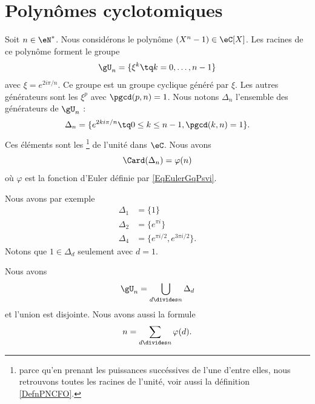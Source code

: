 \section{Polynômes cyclotomiques}

Soit \( n\in \eN^*\). Nous considérons le polynôme \( (X^n-1)\in\eC[X]\). Les racines de ce polynôme forment le groupe
\begin{equation}
    \gU_n=\{ \xi^k\tq k=0,\ldots, n-1 \}
\end{equation}
avec \( \xi= e^{2i\pi/n}\). Ce groupe est un groupe cyclique généré par \( \xi\). Les autres générateurs sont les \( \xi^p\) avec \( \pgcd(p,n)=1\). Nous notons \( \Delta_n\) l'ensemble des générateurs de \( \gU_n\) :
\begin{equation}
    \Delta_n=\{  e^{2ki\pi/n}\tq 0\leq k\leq n-1,\pgcd(k,n)=1 \}.
\end{equation}
Ces éléments sont les \footnote{parce qu'en prenant les puissances succéssives de l'une d'entre elles, nous retrouvons toutes les racines de l'unité, voir aussi la définition \ref{DefnPNCFO}.} de l'unité dans \( \eC\). Nous avons 
\begin{equation}
    \Card(\Delta_n)=\varphi(n)
\end{equation}
où \( \varphi\) est la fonction d'Euler définie par \eqref{EqEulerGqPsvi}.

Nous avons par exemple
\begin{subequations}
    \begin{align}
        \Delta_1&=\{ 1 \}\\
        \Delta_2&=\{  e^{\pi i} \}\\
        \Delta_4&=\{  e^{\pi i/2}, e^{3\pi i/2} \}.
    \end{align}
\end{subequations}
Notons que \( 1\in \Delta_d\) seulement avec \( d=1\).

\begin{lemma}       \label{LemKcpjee}
    Nous avons
    \begin{equation}        \label{EqpZuIyL}
        \gU_n=\bigcup_{d\divides n}\Delta_d
    \end{equation}
    et l'union est disjointe. Nous avons aussi la formule
    \begin{equation}        \label{EqTPHqgJ}
        n=\sum_{d\divides n}\varphi(d).
    \end{equation}
\end{lemma}

